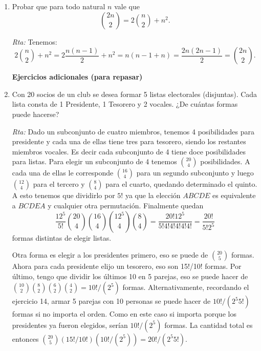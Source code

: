 \begin{enumerate}
    
    
    \item Probar que para todo natural $n$ vale que 
    \begin{equation*}
    \binom{2n}{2} = 2 \binom{n}{2} + n^2.
    \end{equation*}
    
    \noindent\textit{Rta:} Tenemos: $$2\binom{n}{2}+n^2=2\frac{n(n-1)}{2}+n^2={n(n-1+n)}=\frac{2n(2n-1)}{2}=\binom{2n}{2}.$$
    
    
    
    
    \begin{center}
        \textbf{Ejercicios adicionales (para repasar)}
    \end{center}
    
    
    
    
    \item Con 20 socios de un club se desea formar 5 listas electorales (disjuntas). Cada lista
    consta de 1 Presidente, 1 Tesorero y 2 vocales. ¿De cuántas formas puede hacerse?
    
    \noindent\textit{Rta:} Dado un subconjunto de cuatro miembros, tenemos 4 posibilidades para presidente y cada una de ellas tiene tres para tesorero, siendo los restantes miembros vocales. Es decir cada subconjunto de 4 tiene doce posibilidades para listas. Para elegir un subconjunto de 4 tenemos $\binom{20}{4}$ posibilidades. A cada una de ellas le corresponde $\binom{16}{4}$ para un segundo subconjunto y luego $\binom{12}{4}$ para el tercero y $\binom{8}{4}$ para el cuarto, quedando determinado el quinto. A esto tenemos que dividirlo por $5!$ ya que la elección $ABCDE$ es equivalente a  $BCDEA$ y cualquier otra permutación. 
    Finalmente quedan $$\frac{12^5}{5!}\binom{20}{4}\binom{16}{4}\binom{12^5}{4}\binom{8}{4}=\frac{20!12^5}{5!4!4!4!4!4!}=\frac{20!}{5!2^5}$$ formas distintas de elegir listas.
    
    Otra forma es elegir a los presidentes primero, eso se puede de $\binom{20}{5}$ formas. Ahora para cada presidente elijo un tesorero, eso son 15!/10! formas. Por último, tengo que dividir los últimos 10 en 5 parejas, eso se puede hacer de ${10 \choose 2} {8 \choose 2} {6 \choose 2} {4 \choose 2} = 10! / ( 2^5)$ formas. Alternativamente, recordando el ejercicio 14, armar 5 parejas con 10 personas se puede hacer de $10! / ( 2^5 5!)$ formas si no importa el orden. Como en este caso si importa porque los presidentes ya fueron elegidos, serían $10! / ( 2^5)$ formas. La cantidad total es entonces $\binom{20}{5} (15! / 10!) ( 10! / ( 2^5) ) = 20! / (2^5 5!)$.
    

\end{enumerate}
